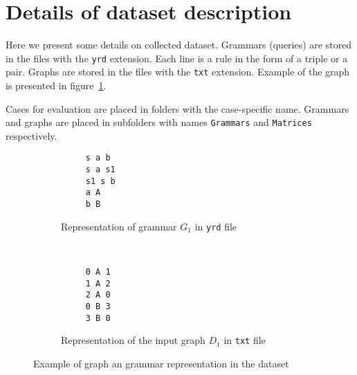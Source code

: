 \section{Details of dataset description}

Here we present some details on collected dataset.
Grammars (queries) are stored in the files with the \verb|yrd| extension.
Each line is a rule in the form of a triple or a pair.
Graphs are stored in the files with the \verb|txt| extension.
Example of the graph is presented in figure~\ref{fig:graph_example}.

Cases for evaluation are placed in folders with the case-specific name.
Grammars and graphs are placed in subfolders with names \verb|Grammars| and \verb|Matrices| respectively.

\begin{figure}[h!]
    \centering
    \begin{subfigure}[b]{0.24\textwidth}
        \centering
        \begin{verbatim}
     s a b
     s a s1
     s1 s b
     a A
     b B
        \end{verbatim}
        \caption{Representation of grammar $G_1$ in \texttt{yrd} file}
    \end{subfigure}%
    ~
    \begin{subfigure}[b]{0.20\textwidth}
        \centering
         \begin{verbatim}
     0 A 1
     1 A 2
     2 A 0
     0 B 3
     3 B 0
 \end{verbatim}

        \caption{Representation of the input graph $D_1$ in \texttt{txt} file}
    \end{subfigure}
    \caption{Example of graph an grammar representation in the dataset}
    \label{fig:graph_example}
\end{figure}
